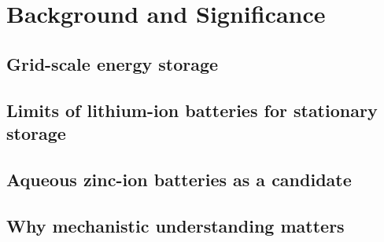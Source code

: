 
\chapter{Background and Significance}
\label{chap:background}

\section{Grid-scale energy storage}

\section{Limits of lithium-ion batteries for stationary storage}

\section{Aqueous zinc-ion batteries as a candidate}

\section{Why mechanistic understanding matters}

